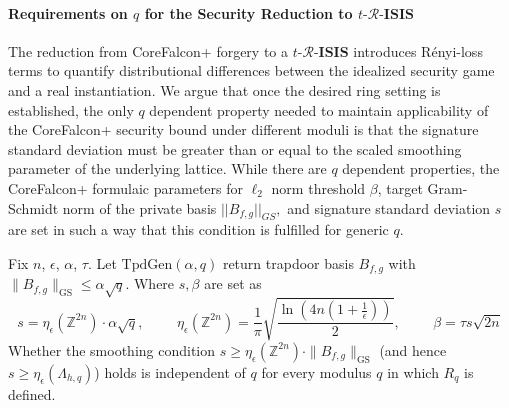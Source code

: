 \paragraph{Requirements on $q$ for the Security Reduction to $t\text{-}\mathcal{R}\text{-}\mathbf{ISIS}$}\label{sqrtq-scaling-argument}

The reduction from CoreFalcon+ forgery to a $t\text{-}\mathcal{R}\text{-}\mathbf{ISIS}$ introduces 
Rényi-loss terms to quantify distributional differences between the idealized security game and 
a real instantiation. We argue that once the desired ring setting is established, 
the only $q$ dependent property needed to maintain applicability of the CoreFalcon+ security bound 
under different moduli is that the signature standard deviation must be greater than or equal to 
the scaled smoothing parameter of the underlying lattice. While there are $q$ dependent properties,
the CoreFalcon+ formulaic parameters for $\ell_2$ norm threshold $\beta$, target Gram-Schmidt norm 
of the private basis $||B_{f,g}||_{GS},$ and signature standard deviation $s$ are set in such a way 
that this condition is fulfilled for generic $q$. 

\begin{lemma}\label{lem:sqrtq-scaling}
  Fix $n$, $\epsilon$, $\alpha$, $\tau$. Let $\mathrm{TpdGen}(\alpha,q)$ return trapdoor basis $B_{f, g}$ with 
  $\|B_{f,g}\|_{\mathrm{GS}}\le\alpha\sqrt{q}$. Where $s, \beta$ are set as
  \[
    s = \eta_\epsilon(\mathbb{Z}^{2n}) \cdot \alpha \sqrt{q},
    \qquad \,\,
    \eta_\epsilon(\mathbb{Z}^{2n}) = \frac{1}{\pi} \sqrt{\frac{\ln\!\left(4n\left(1+\frac{1}{\epsilon}\right)\right)}{2}},
    \qquad \,\,
    \beta = \tau s \sqrt{2n}
  \]
  Whether the smoothing condition $s\ge\eta_\epsilon(\mathbb{Z}^{2n})\cdot\|B_{f,g}\|_{\mathrm{GS}}$ 
  (and hence $s\ge\eta_\epsilon(\Lambda_{h,q})$) holds is independent of $q$ for every modulus $q$ in 
  which $R_q$ is defined.
\end{lemma}

